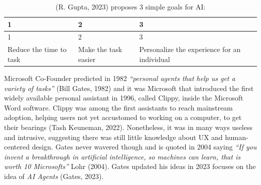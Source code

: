 \documentclass[
  12pt,
  letterpaper,
  DIV=11,
  numbers=noendperiod]{scrartcl}
\begin{document}
\let\pandoctableshortcapt\relax

\def\pandoctableshortcapt{Simple Goals for AI}

\begin{longtable}[]{@{}
  >{\raggedright\arraybackslash}p{}
  >{\raggedright\arraybackslash}p{}
  >{\raggedright\arraybackslash}p{}@{}}
\caption[Simple Goals for AI]{(R. Gupta, 2023) proposes 3 simple goals
for AI:}\tabularnewline
\toprule\noalign{}
\begin{minipage}[b]{\linewidth}\raggedright
1
\end{minipage} & \begin{minipage}[b]{\linewidth}\raggedright
2
\end{minipage} & \begin{minipage}[b]{\linewidth}\raggedright
3
\end{minipage} \\
\midrule\noalign{}
\endfirsthead
\toprule\noalign{}
\begin{minipage}[b]{\linewidth}\raggedright
1
\end{minipage} & \begin{minipage}[b]{\linewidth}\raggedright
2
\end{minipage} & \begin{minipage}[b]{\linewidth}\raggedright
3
\end{minipage} \\
\midrule\noalign{}
\endhead
\bottomrule\noalign{}
\endlastfoot
Reduce the time to task & Make the task easier & Personalize the
experience for an individual \\
\end{longtable}

\let\pandoctableshortcapt\relax

Microsoft Co-Founder predicted in 1982 \emph{``personal agents that help
us get a variety of tasks''} (Bill Gates, 1982) and it was Microsoft
that introduced the first widely available personal assistant in 1996,
called Clippy, inside the Microsoft Word software. Clippy was among the
first assistants to reach mainstream adoption, helping users not yet
accustomed to working on a computer, to get their bearings (Tash
Keuneman, 2022). Nonetheless, it was in many ways useless and intrusive,
suggesting there was still little knowledge about UX and human-centered
design. Gates never wavered though and is quoted in 2004 saying
\emph{``If you invent a breakthrough in artificial intelligence, so
machines can learn, that is worth 10 Microsofts''} Lohr (2004). Gates
updated his ideas in 2023 focuses on the idea of \emph{AI Agents}
(Gates, 2023).
\end{document}
